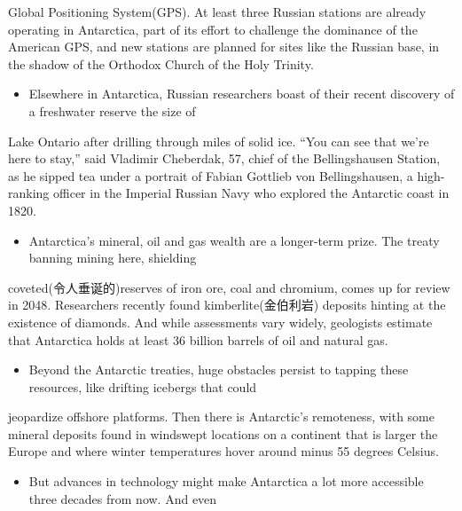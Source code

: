 \documentclass[UTF8,11pt]{ctexart}
\begin{document}
Global Positioning System(GPS). At least three Russian stations are already operating in Antarctica, part of its effort to challenge the dominance of the American GPS, and new stations are planned for sites like the Russian base, in the shadow of the Orthodox Church of the Holy Trinity.


\begin{itemize}[leftmargin=2em,itemsep=.2em,topsep=.4em]\item[F.] Elsewhere in Antarctica, Russian researchers boast of their recent discovery of a freshwater reserve the size of
\end{itemize}

Lake Ontario after drilling through miles of solid ice. “You can see that we’re here to stay,” said Vladimir Cheberdak, 57, chief of the Bellingshausen Station, as he sipped tea under a portrait of Fabian Gottlieb von Bellingshausen, a high-ranking officer in the Imperial Russian Navy who explored the Antarctic coast in 1820.


\begin{itemize}[leftmargin=2em,itemsep=.2em,topsep=.4em]\item[G.] Antarctica’s mineral, oil and gas wealth are a longer-term prize. The treaty banning mining here, shielding
\end{itemize}

coveted(令人垂诞的)reserves of iron ore, coal and chromium, comes up for review in 2048. Researchers recently found kimberlite(金伯利岩) deposits hinting at the existence of diamonds. And while assessments vary widely, geologists estimate that Antarctica holds at least 36 billion barrels of oil and natural gas.


\begin{itemize}[leftmargin=2em,itemsep=.2em,topsep=.4em]\item[H.] Beyond the Antarctic treaties, huge obstacles persist to tapping these resources, like drifting icebergs that could
\end{itemize}

jeopardize offshore platforms. Then there is Antarctic’s remoteness, with some mineral deposits found in windswept locations on a continent that is larger the Europe and where winter temperatures hover around minus 55 degrees Celsius.


\begin{itemize}[leftmargin=2em,itemsep=.2em,topsep=.4em]\item[I.] But advances in technology might make Antarctica a lot more accessible three decades from now. And even
\end{itemize}
\end{document}
